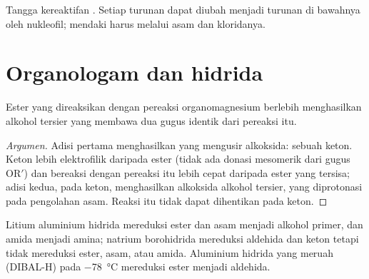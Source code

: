 \begin{omfigure}

{\small Tangga kereaktifan . Setiap turunan dapat
diubah menjadi turunan di bawahnya oleh nukleofil; mendaki harus melalui
asam dan kloridanya.}
\end{omfigure}

\section{Organologam dan hidrida}

\begin{proposition}\label{prop:b2:acyl-substitution:grignard-ester}
Ester yang direaksikan dengan pereaksi organomagnesium berlebih menghasilkan
alkohol tersier yang membawa dua gugus identik dari pereaksi itu.
\end{proposition}

\begin{proof}[Argumen]
Adisi pertama menghasilkan  yang mengusir alkoksida:
sebuah keton. Keton lebih elektrofilik daripada ester (tidak ada donasi
mesomerik dari gugus $\mathrm{OR'}$) dan bereaksi dengan pereaksi itu lebih
cepat daripada ester yang tersisa; adisi kedua, pada keton, menghasilkan
alkoksida alkohol tersier, yang diprotonasi pada pengolahan asam. Reaksi itu
tidak dapat dihentikan pada keton.
\end{proof}

\begin{proposition}\label{prop:b2:acyl-substitution:hydrides}
Litium aluminium hidrida mereduksi ester dan asam menjadi alkohol primer,
dan amida menjadi amina; natrium borohidrida mereduksi aldehida dan keton
tetapi tidak mereduksi ester, asam, atau amida. Aluminium hidrida yang
meruah (DIBAL-H) pada \qty{-78}{\degreeCelsius} mereduksi ester menjadi
aldehida.
\end{proposition}

